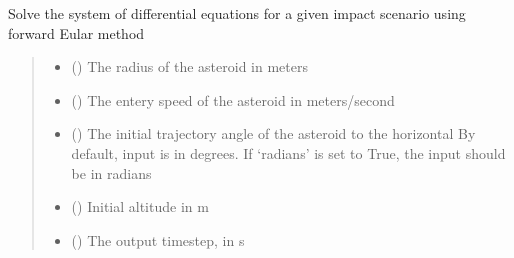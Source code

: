 \documentclass[letterpaper,10pt,english]{sphinxmanual}
\begin{document}
\begin{fulllineitems}

\begin{fulllineitems}
\label{\detokenize{index:solver.Planet.solve_atmospheric_entry_FE}}
\pysigstartsignatures
{}
\pysigstopsignatures
\sphinxAtStartPar
Solve the system of differential equations for a given impact scenario
using forward Eular method
\begin{quote}\begin{description}
\begin{itemize}
\item {} 
\sphinxAtStartPar
{} () \textendash{} The radius of the asteroid in meters

\item {} 
\sphinxAtStartPar
{} () \textendash{} The entery speed of the asteroid in meters/second

\item {} 
\sphinxAtStartPar
{} () \textendash{} The initial trajectory angle of the asteroid to the horizontal
By default, input is in degrees. If ‘radians’ is set to True, the
input should be in radians

\item {} 
\sphinxAtStartPar
{} (\sphinxstyleliteralemphasis{\sphinxupquote{, }}) \textendash{} Initial altitude in m

\item {} 
\sphinxAtStartPar
{} (\sphinxstyleliteralemphasis{\sphinxupquote{, }}) \textendash{} The output timestep, in s

\end{itemize}


\end{description}
\end{quote}
\end{fulllineitems}
\end{fulllineitems}
\end{document}
